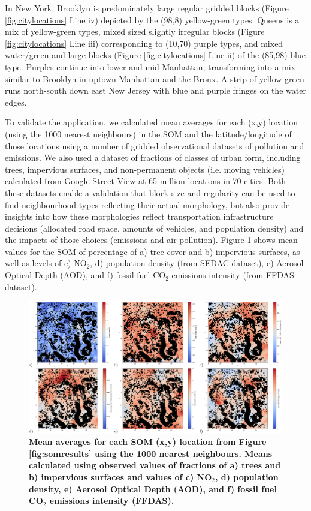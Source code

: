 In New York, Brooklyn is predominately large regular gridded blocks (Figure \ref{fig:citylocations} Line iv) depicted by the (98,8) yellow-green types. Queens is a mix of yellow-green types, mixed sized slightly irregular blocks (Figure \ref{fig:citylocations} Line iii) corresponding to (10,70) purple types, and mixed water/green and large blocks (Figure \ref{fig:citylocations} Line ii) of the (85,98) blue type. Purples continue into lower and mid-Manhattan, transforming into a mix similar to Brooklyn in uptown Manhattan and the Bronx. A strip of yellow-green runs north-south down east New Jersey with blue and purple fringes on the water edges.

To validate the application, we calculated mean averages for each (x,y) location (using the 1000 nearest neighbours) in the SOM and the latitude/longitude of those locations using a number of gridded observational datasets of pollution and emissions. We also used a dataset of fractions of classes of urban form, including trees, impervious surfaces, and non-permanent objects (i.e. moving vehicles) calculated from Google Street View at 65 million locations in 70 cities\cite{Middel2019,Middel2018}. Both these datasets enable a validation that block size and regularity can be used to find neighbourhood types reflecting their actual morphology, but also provide insights into how these morphologies reflect transportation infrastructure decisions (allocated road space, amounts of vehicles, and population density) and the impacts of those choices (emissions and air pollution). Figure \ref{fig:meansomresults} shows mean values for the SOM of percentage of a) tree cover and b) impervious surfaces, as well as levels of c) NO$_{2}$, d) population density (from SEDAC dataset), e) Aerosol Optical Depth (AOD), and f) fossil fuel CO$_{2}$ emissions intensity (from FFDAS dataset).

\begin{figure}
\centering
\includegraphics[trim={0 0 0 0},clip,scale=0.23]{BlockTypologies_Figures4-0.png}
\caption{\bf Mean averages for each SOM (x,y) location from Figure \ref{fig:somresults} using the 1000 nearest neighbours. Means calculated using observed values of fractions of a) trees and b) impervious surfaces and values of c) NO$_{2}$, d) population density, e) Aerosol Optical Depth (AOD), and f) fossil fuel CO$_{2}$ emissions intensity (FFDAS).}
 \label{fig:meansomresults}
\end{figure} 

